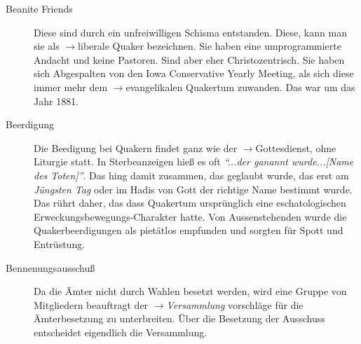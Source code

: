 \begin{description}
 \item[Beanite Friends]
 Diese sind durch ein unfreiwilligen Schisma entstanden. Diese, kann man sie als $\to$liberale Quaker bezeichnen. Sie haben eine umprogrammierte Andacht und keine Pastoren. Sind aber eher Christozentrisch. Sie haben sich Abgespalten von den Iowa Conservative Yearly Meeting, als sich diese immer mehr dem $\to$evangelikalen Quakertum zuwanden. Das war um das Jahr 1881.
  


 \item[Beerdigung] Die Beedigung bei Quakern findet ganz wie der $\to$Gottesdienst, ohne Liturgie statt. In Sterbeanzeigen hieß es oft \textit{"`...der ganannt wurde...[Name des Toten]"'}. Das hing damit zusammen, das geglaubt wurde, das erst am \textit{Jüngsten Tag} oder im Hadis von Gott der richtige Name bestimmt wurde. Das rührt daher, das dass Quakertum ursprünglich eine eschatologischen Erweckungsbewegungs-Charakter hatte. Von Aussenstehenden wurde die Quakerbeerdigungen als pietätlos empfunden und sorgten für Spott und Entrüstung.  

 \item[Bennenungsausschuß] Da die Ämter nicht durch Wahlen besetzt werden, wird eine Gruppe von Mitgliedern beauftragt der $\to$\textit{Versammlung} vorschläge für die Ämterbesetzung zu unterbreiten. Über die Besetzung der Ausschuss entscheidet eigendlich die Versammlung. 
 

\end{description}
